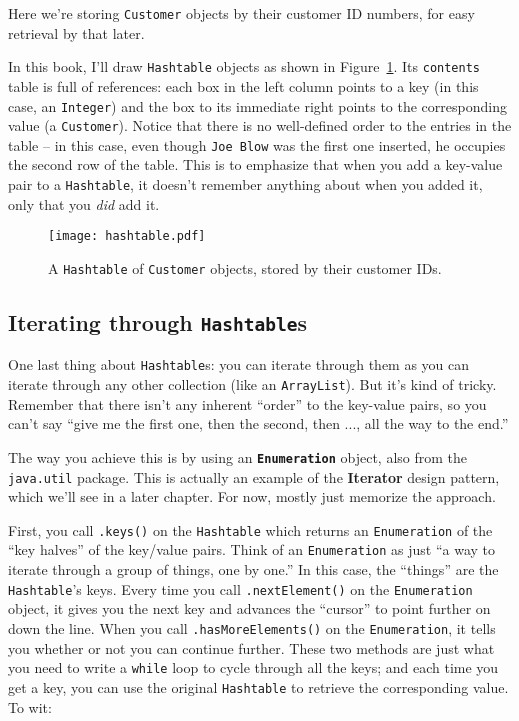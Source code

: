 Here we're storing \texttt{Customer} objects by their customer ID numbers, for
easy retrieval by that later.

In this book, I'll draw \texttt{Hashtable} objects as shown in
Figure~\ref{fig:hashtable}. Its \texttt{contents} table is full of references:
each box in the left column points to a key (in this case, an
\texttt{Integer}) and the box to its immediate right points to the
corresponding value (a \texttt{Customer}). Notice that there is no
well-defined order to the entries in the table -- in this case, even though
\texttt{Joe Blow} was the first one inserted, he occupies the second row of
the table. This is to emphasize that when you add a key-value pair to a
\texttt{Hashtable}, it doesn't remember anything about when you added it, only
that you \textit{did} add it.

\begin{figure}[ht]
\centering
\texttt{[image: hashtable.pdf]}
\caption{A \texttt{Hashtable} of \texttt{Customer} objects, stored by their
customer IDs.}
\label{fig:hashtable}
\end{figure}

\subsection{Iterating through \texttt{Hashtable}s}

One last thing about \texttt{Hashtable}s: you can iterate through them as you
can iterate through any other collection (like an \texttt{ArrayList}). But
it's kind of tricky. Remember that there isn't any inherent ``order'' to the
key-value pairs, so you can't say ``give me the first one, then the second,
then ..., all the way to the end.''

The way you achieve this is by using an \textbf{\texttt{Enumeration}} object,
also from the \texttt{java.util} package. This is actually an example of the
\textbf{Iterator} design pattern, which we'll see in a later chapter. For now,
mostly just memorize the approach.

First, you call \texttt{.keys()} on the \texttt{Hashtable} which returns an
\texttt{Enumeration} of the ``key halves'' of the key/value pairs. Think of an
\texttt{Enumeration} as just ``a way to iterate through a group of things, one
by one.'' In this case, the ``things'' are the \texttt{Hashtable}'s keys. Every
time you call \texttt{.nextElement()} on the \texttt{Enumeration} object, it
gives you the next key and advances the ``cursor'' to point further on down the
line. When you call \texttt{.hasMoreElements()} on the \texttt{Enumeration},
it tells you whether or not you can continue further. These two methods are
just what you need to write a \texttt{while} loop to cycle through all the
keys; and each time you get a key, you can use the original \texttt{Hashtable}
to retrieve the corresponding value. To wit:

